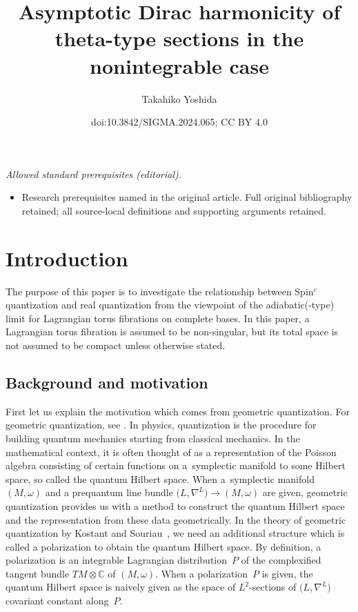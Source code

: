 \documentclass[10pt,a4paper]{amsart}
\title{Asymptotic Dirac harmonicity of theta-type sections in the nonintegrable case}
\author{Takahiko Yoshida}
\date{doi:10.3842/SIGMA.2024.065; CC BY 4.0}
\numberwithin{equation}{section}
\newcommand{\C}{\mathbb{C}}
\begin{document}
\maketitle
\noindent\textit{Allowed standard prerequisites (editorial).}\begin{itemize}
\item Research prerequisites named in the original article. Full original bibliography retained; all source-local definitions and supporting arguments retained.
\end{itemize}\medskip
\section{Introduction}
The purpose of this paper is to investigate the relationship between Spin${}^c$ quantization and real quantization from the viewpoint of the adiabatic(-type) limit for Lagrangian torus fibrations on complete bases. In this paper, a Lagrangian torus fibration is assumed to be non-singular, but its total space is not assumed to be compact unless otherwise stated.

\subsection{Background and motivation}
First let us explain the motivation which comes from geometric quantization. For geometric quantization, see \cite{Hall, Ki2,Sn,Woodhouse}. In physics, quantization is the procedure for building quantum mechanics starting from classical mechanics. In the mathematical context, it is often thought of as a representation of the Poisson algebra consisting of certain functions on a~symplectic manifold to some Hilbert space, so called the quantum Hilbert space. When a~symplectic manifold~$(M,\omega)$ and a prequantum line bundle $\bigl(L,\nabla^L\bigr)\to (M,\omega)$ are given, geometric quantization provides us with a method to construct the quantum Hilbert space and the representation from these data
geometrically. In the theory of geometric quantization by Kostant and Souriau~\cite{Kos1,Sou2, Sou1}, we need an additional structure which is called a polarization to obtain the quantum Hilbert space. By definition, a polarization is an integrable Lagrangian distribution~$P$ of the complexified tangent bundle $TM\otimes \C$ of $(M,\omega)$. When a polarization~$P$ is given, the quantum Hilbert space is naively given as the space of $L^2$-sections of $\bigl(L,\nabla^L\bigr)$ covariant constant along~$P$.
\end{document}
